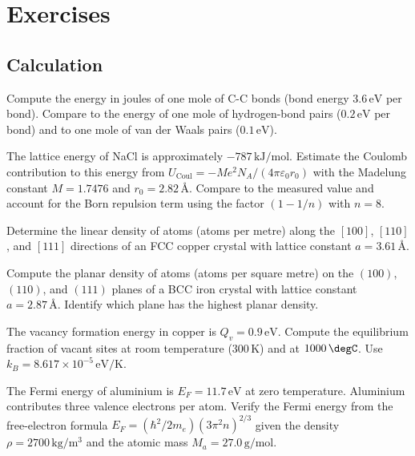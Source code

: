 \section{Exercises}

\subsection*{Calculation}

\begin{exercise}
Compute the energy in joules of one mole of C-C bonds (bond energy
$3.6\,\text{eV}$ per bond). Compare to the energy of one mole of
hydrogen-bond pairs ($0.2\,\text{eV}$ per bond) and to one mole of
van der Waals pairs ($0.1\,\text{eV}$).
\end{exercise}

\begin{exercise}
The lattice energy of NaCl is approximately $-787\,\text{kJ}/\text{mol}$.
Estimate the Coulomb contribution to this energy from
$U_{\text{Coul}} = -M e^2 N_A/(4\pi\varepsilon_0 r_0)$ with the Madelung
constant $M = 1.7476$ and $r_0 = 2.82\,\si{\angstrom}$. Compare to the
measured value and account for the Born repulsion term using the
factor $(1 - 1/n)$ with $n = 8$.
\end{exercise}

\begin{exercise}
Determine the linear density of atoms (atoms per metre) along the
$[100]$, $[110]$, and $[111]$ directions of an FCC copper crystal
with lattice constant $a = 3.61\,\si{\angstrom}$.
\end{exercise}

\begin{exercise}
Compute the planar density of atoms (atoms per square metre) on the
$(100)$, $(110)$, and $(111)$ planes of a BCC iron crystal with
lattice constant $a = 2.87\,\si{\angstrom}$. Identify which plane has
the highest planar density.
\end{exercise}

\begin{exercise}
The vacancy formation energy in copper is $Q_v = 0.9\,\text{eV}$.
Compute the equilibrium fraction of vacant sites at room temperature
($300\,\si{\kelvin}$) and at $1000\,\degC$. Use $k_B = 8.617 \times
10^{-5}\,\text{eV}/\si{\kelvin}$.
\end{exercise}

\begin{exercise}
The Fermi energy of aluminium is $E_F = 11.7\,\text{eV}$ at zero
temperature. Aluminium contributes three valence electrons per atom.
Verify the Fermi energy from the free-electron formula $E_F =
(\hbar^2/2 m_e)(3\pi^2 n)^{2/3}$ given the density $\rho = 2700\,
\text{kg}/\text{m}^3$ and the atomic mass $M_a = 27.0\,\text{g}/\text{mol}$.
\end{exercise}

